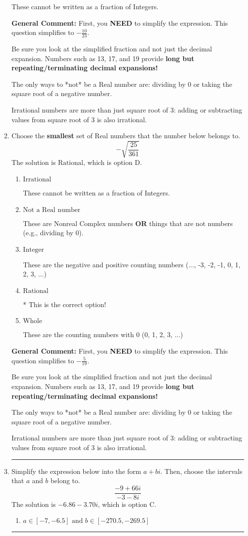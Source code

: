 \documentclass{extbook}[14pt]
\newcommand{\litem}[1]{\item #1

\rule{\textwidth}{0.4pt}}
\begin{document}
\begin{enumerate}
{\begin{enumerate}[label=\Alph*.]
These cannot be written as a fraction of Integers.
\end{enumerate}

\textbf{General Comment:} First, you \textbf{NEED} to simplify the expression. This question simplifies to $-\frac{10}{23}$. 
 
 Be sure you look at the simplified fraction and not just the decimal expansion. Numbers such as 13, 17, and 19 provide \textbf{long but repeating/terminating decimal expansions!} 
 
 The only ways to *not* be a Real number are: dividing by 0 or taking the square root of a negative number. 
 
 Irrational numbers are more than just square root of 3: adding or subtracting values from square root of 3 is also irrational.
}
\litem{
Choose the \textbf{smallest} set of Real numbers that the number below belongs to.
\[ -\sqrt{\frac{25}{361}} \]The solution is \( \text{Rational} \), which is option D.\begin{enumerate}[label=\Alph*.]
\item \( \text{Irrational} \)

These cannot be written as a fraction of Integers.
\item \( \text{Not a Real number} \)

These are Nonreal Complex numbers \textbf{OR} things that are not numbers (e.g., dividing by 0).
\item \( \text{Integer} \)

These are the negative and positive counting numbers (..., -3, -2, -1, 0, 1, 2, 3, ...)
\item \( \text{Rational} \)

* This is the correct option!
\item \( \text{Whole} \)

These are the counting numbers with 0 (0, 1, 2, 3, ...)
\end{enumerate}

\textbf{General Comment:} First, you \textbf{NEED} to simplify the expression. This question simplifies to $-\frac{5}{19}$. 
 
 Be sure you look at the simplified fraction and not just the decimal expansion. Numbers such as 13, 17, and 19 provide \textbf{long but repeating/terminating decimal expansions!} 
 
 The only ways to *not* be a Real number are: dividing by 0 or taking the square root of a negative number. 
 
 Irrational numbers are more than just square root of 3: adding or subtracting values from square root of 3 is also irrational.
}
\litem{
Simplify the expression below into the form $a+bi$. Then, choose the intervals that $a$ and $b$ belong to.
\[ \frac{-9 + 66 i}{-3 - 8 i} \]The solution is \( -6.86  - 3.70 i \), which is option C.\begin{enumerate}[label=\Alph*.]
\item \( a \in [-7, -6.5] \text{ and } b \in [-270.5, -269.5] \)


\end{enumerate}}
\end{enumerate}
\end{document}
